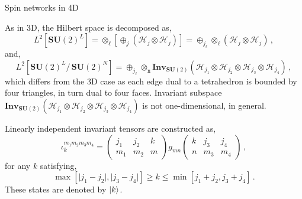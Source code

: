 \documentclass[12pt,titlepage]{article}
\begin{document}
\begin{frame}{Spin networks in 4D}
    \begin{list}{\,}{\leftmargin=1em \itemindent=0em}
        \item<1-> As in 3D, the Hilbert space is decomposed as,
        \begin{equation}
            L^2[{\mathbf{SU}(2)}^L]=\otimes_\ell\left[\oplus_j(\mathcal{H}_j\otimes\mathcal{H}_j)\right]=\oplus_{j_\ell}\otimes_\ell(\mathcal{H}_j\otimes\mathcal{H}_j)\,,
        \end{equation}
        and,
        \begin{equation}
            L^2[{\mathbf{SU}(2)}^L/\,{\mathbf{SU}(2)}^N]=\oplus_{j_\ell}\otimes_\mathtt{n}\mathbf{Inv}_{\mathbf{SU}(2)}(\mathcal{H}_{j_1}\otimes\mathcal{H}_{j_2}\otimes\mathcal{H}_{j_3}\otimes\mathcal{H}_{j_4})\,,
        \end{equation}
        which differs from the 3D case as each edge dual to a tetrahedron is bounded by four triangles, in turn dual to four faces. Invariant subspace $\mathbf{Inv}_{\mathbf{SU}(2)}(\mathcal{H}_{j_1}\otimes\mathcal{H}_{j_2}\otimes\mathcal{H}_{j_3}\otimes\mathcal{H}_{j_4})$ is not one-dimensional, in general.
        \item<2-> Linearly independent invariant tensors are constructed as,
        \begin{equation}
            \iota^{m_1m_2m_3m_4}_k=
            \begin{pmatrix}
                j_1 & j_2 & k \\
                m_1 & m_2 & m
            \end{pmatrix}
            g_{mn}
            \begin{pmatrix}
                k & j_3 & j_4 \\
                n & m_3 & m_4
            \end{pmatrix}\,,
        \end{equation}
        for any $k$ satisfying,
        \begin{equation}
            \operatorname{max}[\lvert j_1-j_2\rvert,\lvert j_3-j_4\rvert]\geq k\leq\operatorname{min}[j_1+j_2,j_3+j_4]\,.
        \end{equation} 
        These states are denoted by $\ket{k}$.
    \end{list}
\end{frame}
\end{document}
